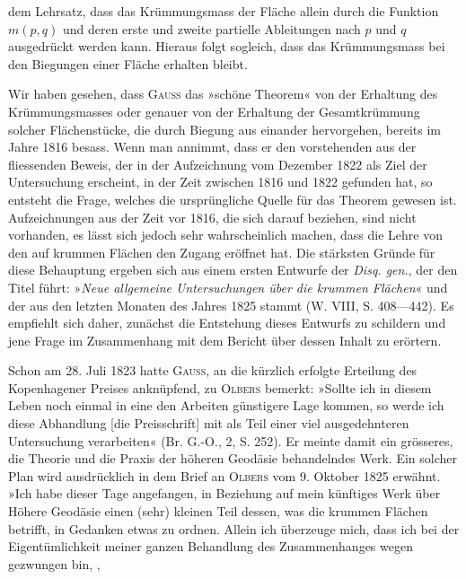 dem Lehrsatz, dass das Krümmungsmass der Fläche allein durch die Funktion
\(m(p,q)\) und deren erste und zweite partielle Ableitungen nach \(p\) und \(q\) ausgedrückt
werden kann. Hieraus folgt sogleich, dass das Krümmungsmass bei
den Biegungen einer Fläche erhalten bleibt.
\par
Wir haben gesehen, dass \textsc{Gauss} das »schöne Theorem« von der Erhaltung
des Krümmungsmasses oder genauer von der Erhaltung der Gesamtkrümmung
solcher Flächenstücke, die durch Biegung aus einander hervorgehen, bereits
im Jahre 1816 besass. Wenn man annimmt, dass er den vorstehenden aus
der  fliessenden Beweis, der in der Aufzeichnung
vom Dezember 1822 als Ziel der Untersuchung erscheint, in der Zeit zwischen
1816 und 1822 gefunden hat, so entsteht die Frage, welches die ursprüngliche
Quelle für das Theorem gewesen ist. Aufzeichnungen aus der Zeit vor 1816,
die sich darauf beziehen, sind nicht vorhanden, es lässt sich jedoch sehr wahrscheinlich
machen, dass die Lehre von den  auf krummen
Flächen den Zugang eröffnet hat.
\clearpage{}\setcounter{footnote}{0}
\indent Die stärksten Gründe für diese Behauptung ergeben sich aus einem ersten
Entwurfe der \textit{Disq. gen.}, der den Titel führt: »\textit{Neue allgemeine Untersuchungen
über die krummen Flächen}« und der aus den letzten Monaten des Jahres 1825
stammt (W. VIII, S. 408—442). Es empfiehlt sich daher, zunächst die Entstehung
dieses Entwurfs zu schildern und jene Frage im Zusammenhang mit
dem Bericht über dessen Inhalt zu erörtern.
\par
Schon am 28. Juli 1823 hatte \textsc{Gauss}, an die kürzlich erfolgte Erteilung
des Kopenhagener Preises anknüpfend, zu \textsc{Olbers} bemerkt: »Sollte ich in
diesem Leben noch einmal in eine den Arbeiten günstigere Lage kommen,
so werde ich diese Abhandlung [die Preisschrift] mit als Teil einer viel ausgedehnteren
Untersuchung verarbeiten« (Br. G.-O., 2, S. 252). Er meinte
damit ein grösseres, die Theorie und die Praxis der höheren Geodäsie behandelndes
Werk. Ein solcher Plan wird ausdrücklich in dem Brief an \textsc{Olbers}
vom 9. Oktober 1825 erwähnt. »Ich habe dieser Tage angefangen, in
Beziehung auf mein künftiges Werk über Höhere Geodäsie einen (sehr) kleinen
Teil dessen, was die krummen Flächen betrifft, in Gedanken etwas zu ordnen.
Allein ich überzeuge mich, dass ich bei der Eigentümlichkeit meiner ganzen
Behandlung des Zusammenhanges wegen gezwungen bin, ,
